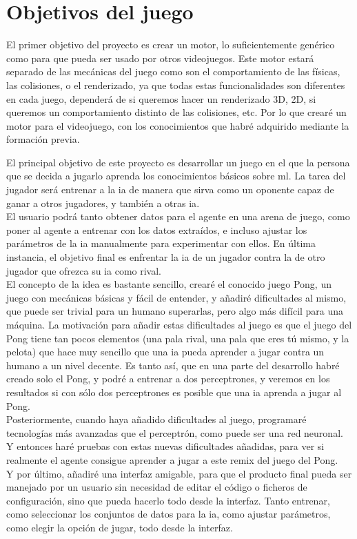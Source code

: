 \section{Objetivos del juego}
El primer objetivo del proyecto es crear un motor, lo suficientemente genérico como para que pueda ser usado por otros videojuegos. Este motor estará separado de las mecánicas del juego como son el comportamiento de las físicas, las colisiones, o el renderizado, ya que todas estas funcionalidades son diferentes en cada juego, dependerá de si queremos hacer un renderizado 3D, 2D, si queremos un comportamiento distinto de las colisiones, etc. Por lo que crearé un motor para el videojuego, con los conocimientos que habré adquirido mediante la formación previa.

El principal objetivo de este proyecto es desarrollar un juego en el que la persona que se decida a jugarlo aprenda los conocimientos básicos sobre \gls{ml}. La tarea del jugador será entrenar a la \gls{ia} de manera que sirva como un oponente capaz de ganar a otros jugadores, y también a otras \gls{ia}.
\\
El usuario podrá tanto obtener datos para el agente en una arena de juego, como poner al agente a entrenar con los datos extraídos, e incluso ajustar los parámetros de la \gls{ia} manualmente para experimentar con ellos. En última instancia, el objetivo final es enfrentar la \gls{ia} de un jugador contra la de otro jugador que ofrezca su \gls{ia} como rival. 
\\
El concepto de la idea es bastante sencillo, crearé el conocido juego Pong, un juego con mecánicas básicas y fácil de entender, y añadiré dificultades al mismo, que puede ser trivial para un humano superarlas, pero algo más difícil para una máquina. La motivación para añadir estas dificultades al juego es que el juego del Pong tiene tan pocos elementos (una pala rival, una pala que eres tú mismo, y la pelota) que hace muy sencillo que una \gls{ia} pueda aprender a jugar contra un humano a un nivel decente. Es tanto así, que en una parte del  desarrollo habré creado solo el Pong, y podré a entrenar a dos perceptrones, y veremos en los resultados si con sólo dos perceptrones es posible que una \gls{ia} aprenda a jugar al Pong.
\\
Posteriormente, cuando haya añadido dificultades al juego, programaré tecnologías más avanzadas que el perceptrón, como puede ser una red neuronal. Y entonces haré pruebas con estas nuevas dificultades añadidas, para ver si realmente el agente consigue aprender a jugar a este remix del juego del Pong.
\\
Y por último, añadiré una interfaz amigable, para que el producto final pueda ser manejado por un usuario sin necesidad de editar el código o ficheros de configuración, sino que pueda hacerlo todo desde la interfaz. Tanto entrenar, como seleccionar los conjuntos de datos para la \gls{ia}, como ajustar parámetros, como elegir la opción de jugar, todo desde la interfaz.

